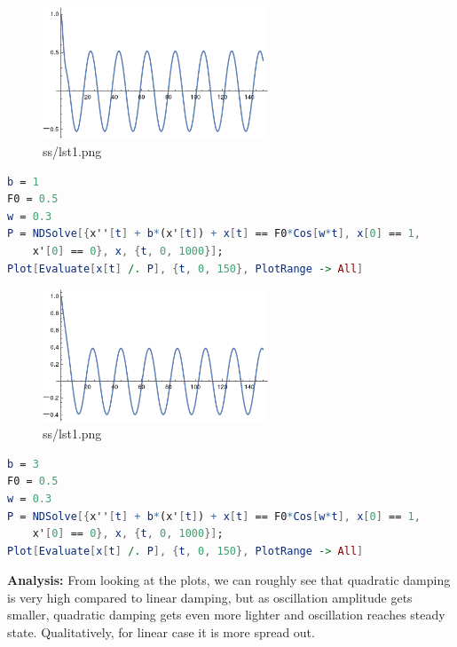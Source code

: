 \documentclass[12pt,letter]{article}
\begin{document}
{\begin{tcolorbox}
	\begin{figure}[H]
		\centering
		\includegraphics[width=0.6\textwidth]{ss/sshw4/7.png}
		\caption{ss/lst1.png}
		\label{fig:ss-lst1-png}
	\end{figure}
\begin{lstlisting}[language=Mathematica]
b = 1
F0 = 0.5
w = 0.3
P = NDSolve[{x''[t] + b*(x'[t]) + x[t] == F0*Cos[w*t], x[0] == 1, 
    x'[0] == 0}, x, {t, 0, 1000}];
Plot[Evaluate[x[t] /. P], {t, 0, 150}, PlotRange -> All]
\end{lstlisting}
\end{tcolorbox}

\begin{tcolorbox}
	\begin{figure}[H]
		\centering
		\includegraphics[width=0.6\textwidth]{ss/sshw4/8.png}
		\caption{ss/lst1.png}
		\label{fig:ss-lst1-png}
	\end{figure}
\begin{lstlisting}[language=Mathematica]
b = 3
F0 = 0.5
w = 0.3
P = NDSolve[{x''[t] + b*(x'[t]) + x[t] == F0*Cos[w*t], x[0] == 1, 
    x'[0] == 0}, x, {t, 0, 1000}];
Plot[Evaluate[x[t] /. P], {t, 0, 150}, PlotRange -> All]
\end{lstlisting}
\end{tcolorbox}

\textbf{Analysis: } From looking at the plots, we can roughly see that quadratic damping is very high compared to linear damping, but as oscillation amplitude gets smaller, quadratic damping gets even more lighter and oscillation reaches steady state. Qualitatively, for linear case it is more spread out. 

}
\end{document}
